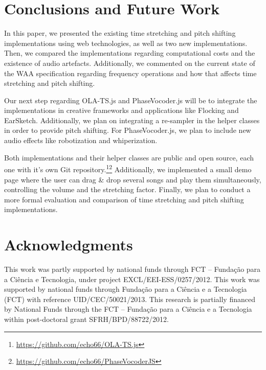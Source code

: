 \documentclass{sig-alternate}
\begin{document}
\section{Conclusions and Future Work}
\begin{sloppypar}
In this paper, we presented the existing time stretching and pitch shifting implementations using web technologies, as well as two new implementations. Then, we compared the implementations regarding computational costs and the existence of audio artefacts. Additionally, we commented on the current state of the WAA specification regarding frequency operations and how that affects time stretching and pitch shifting.

Our next step regarding OLA-TS.js and PhaseVocoder.js will be to integrate the implementations in creative frameworks and applications like Flocking and EarSketch. Additionally, we plan on integrating a re-sampler in the helper classes in order to provide pitch shifting. For PhaseVocoder.js, we plan to include new audio effects like robotization and whiperization.

Both implementations and their helper classes are public and open source, each one with it's own Git repository.\footnote{\url{https://github.com/echo66/OLA-TS.js}}\footnote{\url{https://github.com/echo66/PhaseVocoderJS}} Additionally, we implemented a small demo page where the user can drag \& drop several songs and play them simultaneously, controlling the volume and the stretching factor. Finally, we plan to conduct a more formal evaluation and comparison of time stretching and pitch shifting implementations.
\end{sloppypar}

\section{Acknowledgments}

This work was partly supported by national funds through FCT – Fundação  para a Ciência e Tecnologia, under project EXCL/EEI-ESS/0257/2012.
This work was supported by national funds through Fundação para a Ciência e a Tecnologia (FCT) with reference UID/CEC/50021/2013.
This research is partially financed by National Funds through the FCT – Fundação para a Ciência e a Tecnologia within post-doctoral grant SFRH/BPD/88722/2012.

%

%
%
\balance
\end{document}
